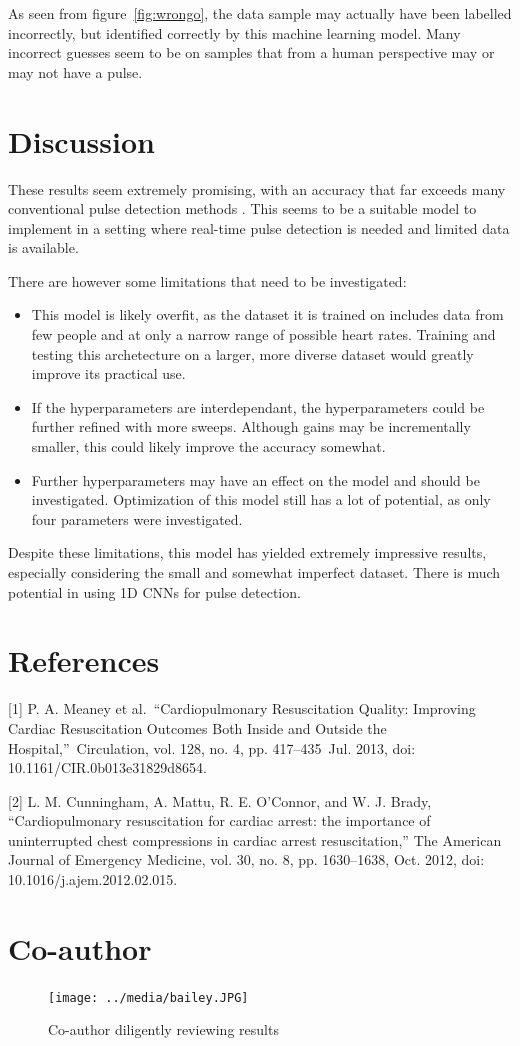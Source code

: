 \documentclass{article}
\begin{document}
As seen from figure~\ref{fig:wrongo}, the data sample may actually have been labelled incorrectly, but identified correctly by this machine learning model. Many incorrect guesses seem to be on samples that from a human perspective may or may not have a pulse.


\section{Discussion}

These results seem extremely promising, with an accuracy that far exceeds many conventional pulse detection methods . This seems to be a suitable model to implement in a setting where real-time pulse detection is needed and limited data is available. 

There are however some limitations that need to be investigated:
\begin{itemize}

    \item This model is likely overfit, as the dataset it is trained on includes data from few people and at only a narrow range of possible heart rates. Training and testing this archetecture on a larger, more diverse dataset would greatly improve its practical use.
    \item If the hyperparameters are interdependant, the hyperparameters could be further refined with more sweeps. Although gains may be incrementally smaller, this could likely improve the accuracy somewhat. 
    \item Further hyperparameters may have an effect on the model and should be investigated. Optimization of this model still has a lot of potential, as only four parameters were investigated.
    
\end{itemize}

Despite these limitations, this model has yielded extremely impressive results, especially considering the small and somewhat imperfect dataset. There is much potential in using 1D CNNs for pulse detection.

\newpage
\section*{References}
{
\small

[1]	P. A. Meaney et al.\ “Cardiopulmonary Resuscitation Quality: Improving Cardiac Resuscitation Outcomes Both Inside and Outside the Hospital,”\ Circulation, vol. 128, no. 4, pp. 417–435\ Jul. 2013, doi: 10.1161/CIR.0b013e31829d8654.


[2]	L. M. Cunningham, A. Mattu, R. E. O’Connor, and W. J. Brady, “Cardiopulmonary resuscitation for cardiac arrest: the importance of uninterrupted chest compressions in cardiac arrest resuscitation,” The American Journal of Emergency Medicine, vol. 30, no. 8, pp. 1630–1638, Oct. 2012, doi: 10.1016/j.ajem.2012.02.015.
}

\newpage
\appendix

\section{Co-author}

\begin{figure}[H]
    \centering
    \texttt{[image: ../media/bailey.JPG]}
    \caption{Co-author diligently reviewing results}
    \label{fig:bailey}
\end{figure}
\end{document}
